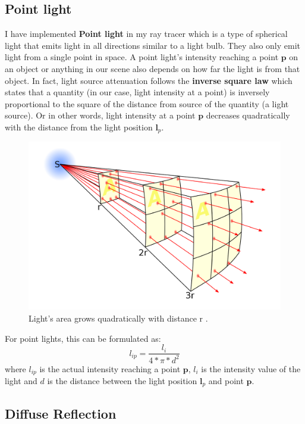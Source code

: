 \documentclass[11pt,a4paper]{article}
\begin{document}
	\subsection{Point light}
	I have implemented \textbf{Point light} in my ray tracer which is a type of spherical light that emits light in all directions similar to a light bulb. They also only emit light from a single point in space. A point light's intensity reaching a point $\boldsymbol{p}$ on an object or anything in our scene also depends on how far the light is from that object. In fact, light source attenuation follows the \textbf{inverse square law} \cite{inversesquarelaw2} which states that a quantity (in our case, light intensity at a point) is inversely proportional to the square of the distance from source of the quantity (a light source). Or in other words, light intensity at a point $\boldsymbol{p}$ decreases quadratically with the distance from the light position $\boldsymbol{l}_{p}$. 
	\begin{figure}[H]
		\centering
		\includegraphics[width=.5\textwidth]{inverse_square_law.png}\quad
		\caption{Light's area grows quadratically with distance r \protect\cite{inversesquarelaw}.}
	\end{figure}
	\noindent For point lights, this can be formulated as:
	\begin{equation}
	l_{ip} = \frac{l_{i}}{4 * \pi * d^2}
	\end{equation}
	where $l_{ip}$ is the actual intensity reaching a point $\boldsymbol{p}$, $l_{i}$ is the intensity value of the light and $d$ is the distance between the light position $\boldsymbol{l}_{p}$ and point $\boldsymbol{p}$.
	\subsection{Diffuse Reflection} 
	
\end{document}
